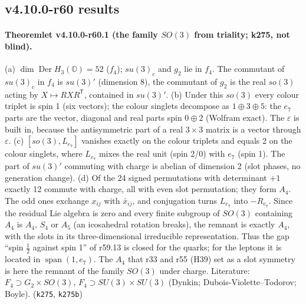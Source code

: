 \subsection*{v4.10.0-r60 results}
\label{subsec:v4100-r60-results}

\paragraph{Theoremlet v4.10.0-r60.1 (the family \(SO(3)\) from triality; k275, not blind).}
(a) \(\dim\operatorname{Der}H_3(\mathbb O)=52\) (\(f_4\)); \(su(3)_c\) and \(g_2\) lie in \(f_4\).  The commutant of \(su(3)_c\) in \(f_4\) is \(su(3)'\) (dimension 8),
the commutant of \(g_2\) is the real \(so(3)\) acting by \(X\mapsto RXR^{\mathsf T}\), contained in \(su(3)'\).
(b) Under this \(so(3)\) every colour triplet is spin 1 (six vectors); the colour singlets decompose as \(1\oplus3\oplus5\): the \(e_7\) parts are the
vector, diagonal and real parts spin \(0\oplus2\) (Wolfram exact).  The \(\varepsilon\) is built in, because the antisymmetric part of a real \(3\times3\)
matrix is a vector through \(\varepsilon\).
(c) \([so(3),L_{e_7}]\) vanishes exactly on the colour triplets and equals 2 on the colour singlets, where \(L_{e_7}\) mixes the real unit
(spin 2/0) with \(e_7\) (spin 1).  The part of \(su(3)'\) commuting with charge is abelian of dimension 2 (slot phases, no generation change).
(d) Of the 24 signed permutations with determinant \(+1\) exactly 12 commute with charge, all with even slot permutation; they form \(A_4\).  The odd
ones exchange \(x_{ij}\) with \(\bar x_{ij}\), and conjugation turns \(L_{e_7}\) into \(-R_{e_7}\).  Since the residual Lie algebra is zero and every finite
subgroup of \(SO(3)\) containing \(A_4\) is \(A_4\), \(S_4\) or \(A_5\) (an icosahedral rotation breaks), the remnant is exactly \(A_4\), with the slots in its
three-dimensional irreducible representation.
Thus the gap ``spin \(\tfrac12\) against spin 1'' of r59.13 is closed for the quarks; for the leptons it is located in \(\operatorname{span}(1,e_7)\).  The
\(A_4\) that r33 and r55 (H39) set as a slot symmetry is here the remnant of the family \(SO(3)\) under charge.  Literature: \(F_4\supset G_2\times SO(3)\),
\(F_4\supset SU(3)\times SU(3)\) (Dynkin; Dubois-Violette--Todorov; Boyle).  (\texttt{k275}, \texttt{k275b})

